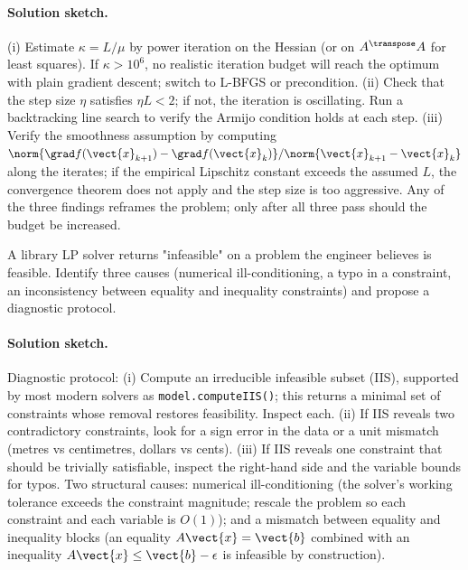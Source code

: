 \paragraph{Solution sketch.}
(i) Estimate $\kappa = L/\mu$ by power iteration on the Hessian
(or on $A^{\transpose} A$ for least squares). If $\kappa > 10^{6}$,
no realistic iteration budget will reach the optimum with plain
gradient descent; switch to L-BFGS or precondition. (ii) Check
that the step size $\eta$ satisfies $\eta L < 2$; if not, the
iteration is oscillating. Run a backtracking line search to verify
the Armijo condition holds at each step. (iii) Verify the
smoothness assumption by computing $\norm{\grad f(\vect{x}_{k+1})
- \grad f(\vect{x}_{k})} / \norm{\vect{x}_{k+1} - \vect{x}_{k}}$
along the iterates; if the empirical Lipschitz constant exceeds
the assumed $L$, the convergence theorem does not apply and the
step size is too aggressive. Any of the three findings reframes
the problem; only after all three pass should the budget be
increased.

\begin{exercise}
A library LP solver returns "infeasible" on a problem the
engineer believes is feasible. Identify three causes (numerical
ill-conditioning, a typo in a constraint, an inconsistency
between equality and inequality constraints) and propose a
diagnostic protocol.
\end{exercise}

\paragraph{Solution sketch.}
Diagnostic protocol: (i) Compute an irreducible infeasible subset
(IIS), supported by most modern solvers as \verb|model.computeIIS()|;
this returns a minimal set of constraints whose removal restores
feasibility. Inspect each. (ii) If IIS reveals two contradictory
constraints, look for a sign error in the data or a unit mismatch
(metres vs centimetres, dollars vs cents). (iii) If IIS reveals
one constraint that should be trivially satisfiable, inspect the
right-hand side and the variable bounds for typos. Two structural
causes: numerical ill-conditioning (the solver's working tolerance
exceeds the constraint magnitude; rescale the problem so each
constraint and each variable is $O(1)$); and a mismatch between
equality and inequality blocks (an equality $A \vect{x} = \vect{b}$
combined with an inequality $A \vect{x} \leq \vect{b} - \epsilon$
is infeasible by construction).

